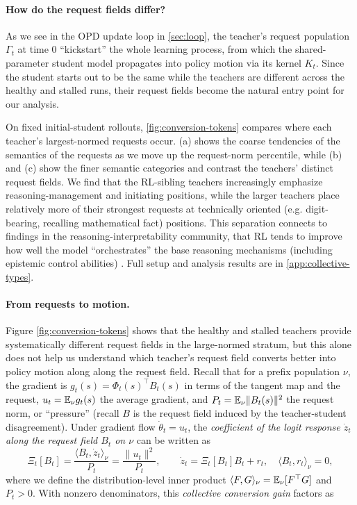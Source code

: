 \paragraph{How do the request fields differ?} As we see in the OPD update loop in \cref{sec:loop}, the teacher's request population $\Gamma_t$ at time 0 ``kickstart'' the whole learning process, from which the shared-parameter student model propagates into policy motion via its kernel $K_t$. Since the student starts out to be the same while the teachers are different across the healthy and stalled runs, their request fields become the natural entry point for our analysis.

On fixed initial-student rollouts, \cref{fig:conversion-tokens} compares where each teacher's largest-normed requests occur. (a) shows the coarse tendencies of the semantics of the requests as we move up the request-norm percentile, while (b) and (c) show the finer semantic categories and contrast the teachers' distinct request fields. We find that the RL-sibling teachers increasingly emphasize reasoning-management and initiating positions, while the larger teachers place relatively more of their strongest requests at technically oriented (e.g. digit-bearing, recalling mathematical fact) positions. This separation connects to findings in the reasoning-interpretability community, that RL tends to improve how well the model ``orchestrates'' the base reasoning mechanisms (including epistemic control abilities) \citep{venhoff2025base}. Full setup and analysis results are in \cref{app:collective-types}.



\paragraph{From requests to motion.}
Figure \ref{fig:conversion-tokens} shows that the healthy and stalled teachers provide systematically different request fields in the large-normed stratum, but this alone does not help us understand which teacher's request field converts better into policy motion along along the request field. 
Recall that for a prefix population $\nu$, the gradient is $g_t(s)=\Phi_t(s)^\top B_t(s)$ in terms of the tangent map and the request, $u_t=\mathbb{E}_\nu g_t(s)$ the average gradient, and $P_t=\mathbb{E}_\nu\|B_t(s)\|^2$ the request norm, or ``pressure'' (recall $B$ is the request field induced by the teacher-student disagreement).
Under gradient flow $\dot\theta_t=u_t$, the \emph{coefficient of the logit response $\dot{z}_t$ along the request field $B_t$ on $\nu$} can be written as
\begin{equation}
\Xi_t[B_t]
=\frac{\langle B_t,\dot z_t\rangle_\nu}{P_t}
=\frac{\|u_t\|^2}{P_t},
\qquad
\dot z_t=\Xi_t[B_t]B_t+r_t,\quad
\langle B_t,r_t\rangle_\nu=0,
\label{eq:collective-response}
\end{equation}
where we define the distribution-level inner product $\langle F,G\rangle_\nu=\mathbb{E}_\nu[F^\top G]$ and $P_t>0$. With nonzero denominators, this \emph{collective conversion gain} factors as

